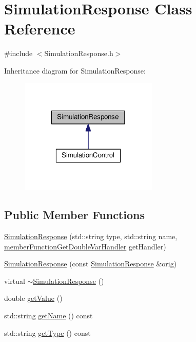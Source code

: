 \hypertarget{class_simulation_response}{\section{Simulation\-Response Class Reference}
\label{class_simulation_response}
}


{\ttfamily \#include $<$Simulation\-Response.\-h$>$}



Inheritance diagram for Simulation\-Response\-:
\nopagebreak
\begin{figure}[H]
\begin{center}
\leavevmode
\includegraphics[width=186pt]{class_simulation_response__inherit__graph}
\end{center}
\end{figure}
\subsection*{Public Member Functions}
\begin{DoxyCompactItemize}
\item 
\hyperlink{class_simulation_response_ac1e30f0ae4469ce18df3261e7d4c4781}{Simulation\-Response} (std\-::string type, std\-::string name, \hyperlink{_listener_8h_aa97195a0d80442c68665a1267e6ea97b}{member\-Function\-Get\-Double\-Var\-Handler} get\-Handler)
\item 
\hyperlink{class_simulation_response_aaa3a1bdb3a9a330eea2264fdeaa2bdb2}{Simulation\-Response} (const \hyperlink{class_simulation_response}{Simulation\-Response} \&orig)
\item 
virtual \hyperlink{class_simulation_response_acca988782297cd916b8a8532368fc94d}{$\sim$\-Simulation\-Response} ()
\item 
double \hyperlink{class_simulation_response_a192c1e10f0ecd3e6f6a06990bc73c07a}{get\-Value} ()
\item 
std\-::string \hyperlink{class_simulation_response_a2f1db747e9dfd4d641d761b6cf23af9b}{get\-Name} () const 
\item 
std\-::string \hyperlink{class_simulation_response_a3fd37c35a74ec17b651eea2e145ecf4f}{get\-Type} () const 
\end{DoxyCompactItemize}
